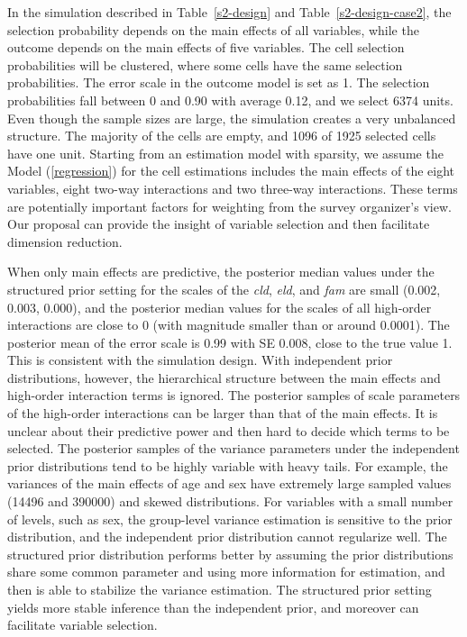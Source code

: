 \documentclass[11pt]{article}
\numberwithin{figure}{section}
\numberwithin{table}{section}
\numberwithin{equation}{section}
\begin{document}
In the simulation described in Table~\ref{s2-design} and
Table~\ref{s2-design-case2}, the selection probability depends on the main
effects of all variables, while the outcome depends on the main effects of five
variables. The cell selection probabilities will be clustered, where some cells
have the same selection probabilities. The error scale in the outcome model is
set as 1. The selection probabilities fall between 0 and 0.90 with average
0.12, and we select 6374 units. Even though the sample sizes are large, the
simulation creates a very unbalanced structure. The majority of the cells are
empty, and 1096 of 1925 selected cells have one unit. Starting from an
estimation model with sparsity, we assume the Model (\ref{regression}) for the
cell estimations includes the main effects of the eight variables, eight
two-way interactions and two three-way interactions. These terms are
potentially important factors for weighting from the survey organizer's view.
Our proposal can provide the insight of variable selection and then facilitate
dimension reduction. 

When only main effects are predictive, the posterior median values under the
structured prior setting for the scales of the {\em cld}, {\em eld}, and {\em
fam} are small (0.002, 0.003, 0.000), and the posterior median values for the
scales of all high-order interactions are close to 0 (with magnitude smaller
than or around 0.0001). The posterior mean of the error scale is 0.99 with SE
0.008, close to the true value 1. This is consistent with the simulation
design. With independent prior distributions, however, the hierarchical
structure between the main effects and high-order interaction terms is ignored.
The posterior samples of scale parameters of the high-order interactions can be
larger than that of the main effects. It is unclear about their predictive
power and then hard to decide which terms to be selected. The posterior samples
of the variance parameters under the independent prior distributions tend to be
highly variable with heavy tails. For example, the variances of the main
effects of age and sex have extremely large sampled values (14496 and 390000)
and skewed distributions. For variables with a small number of levels, such as
sex, the group-level variance estimation is sensitive to the prior
distribution, and the independent prior distribution cannot regularize well.
The structured prior distribution performs better by assuming the prior
distributions share some common parameter and using more information for
estimation, and then is able to stabilize the variance estimation. The
structured prior setting yields more stable inference than the independent
prior, and moreover can facilitate variable selection.  
\end{document}
